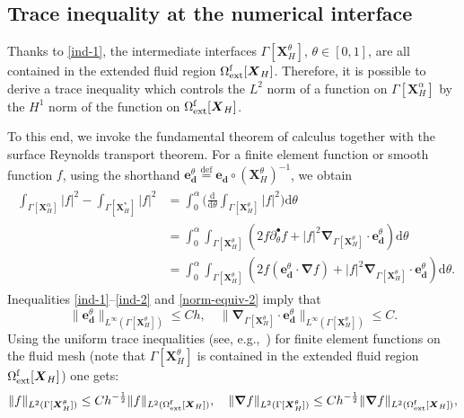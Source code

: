 \documentclass[11pt,reqno]{amsart}
\theoremstyle{definition}
\theoremstyle{plain}
\numberwithin{theorem}{section}
\numberwithin{proposition}{section}
\numberwithin{lemma}{section}
\numberwithin{equation}{section}
\newcommand{\bs}[1]{\boldsymbol{#1}}
\newcommand{\uu}[1]  {{\bs{#1}} }
\newcommand{\grad}   { \uu{\nabla}    }
\def\d{\mathrm{d}}
\renewcommand{\(}{\bigl(}
\renewcommand{\)}{\bigr)}
\def\eqd{\stackrel{\mathrm{def}}{=}}
\begin{document}
\subsection{Trace inequality at the numerical interface}
\label{section:trace}

Thanks to \eqref{ind-1}, the intermediate interfaces $\Gamma[{\bs X}_H^\theta]$, $\theta\in[0,1]$, are all contained in the extended fluid region $\Omega^{\rm f}_{\rm ext}[\bs X_H]$. Therefore, it is possible to derive a trace inequality which controls the $L^2$ norm of a function on $\Gamma[\bs X_H^\alpha]$ by the $H^1$ norm of the function on $\Omega^{\rm f}_{\rm ext}[\bs X_H]$. 

To this end, we invoke the fundamental theorem of calculus together with the surface Reynolds transport theorem. For a finite element function or smooth function $f$, using the shorthand ${\bs e}_{\bs d}^\theta\eqd{\bs e}_{\bs d}\circ({\bs X}_H^\theta)^{-1}$, we obtain
\begin{align}\label{L2-f-interface}
\begin{aligned}
\int_{\Gamma[\bs X_H^\alpha]} | f |^2 - \int_{\Gamma[\bs X_H^*]} | f |^2 
&= \int_0^{\alpha} \Big( \frac{\d}{\d\theta}\int_{\Gamma[\bs X_H^\theta]} | f |^2\Big) \d\theta \\
&= \int_0^{\alpha} \int_{\Gamma[\bs X_H^\theta]} ( 2f \partial_\theta^\bullet f + |f|^2\grad_{\Gamma[\bs X_H^\theta]}\cdot {\bs e}_{\bs d}^\theta) \d\theta \\
&= \int_0^{\alpha} \int_{\Gamma[\bs X_H^\theta]}( 2f ({\bs e}_{\bs d}^\theta\cdot \grad f) + |f|^2\grad_{\Gamma[\bs X_H^\theta]}\cdot {\bs e}_{\bs d}^\theta) \d\theta .
\end{aligned}
\end{align}
Inequalities \eqref{ind-1}--\eqref{ind-2} and \eqref{norm-equiv-2} imply that 
\begin{equation}\label{aux1006}
\|{\bs e}_{\bs d}^\theta\|_{L^{\infty}(\Gamma[\bs X_H^\theta])} \le C h ,\quad 
\|\grad_{\Gamma[\bs X_H^\theta]}\cdot {\bs e}_{\bs d}^\theta\|_{L^\infty(\Gamma[\bs X_H^\theta])}\le C .
\end{equation}
Using the uniform  trace inequalities (see, e.g.,~\cite{GuzmOlsh}) for finite element functions on the fluid mesh (note that $\Gamma[{\bs X}_H^\theta]$ is contained in the extended fluid region $\Omega^{\rm f}_{\rm ext}[{\bs X}_H]$) one gets:  
$$
\|f\|_{L^2(\Gamma[\bs X_H^\theta])} \le Ch^{-\frac12}\|f\|_{L^2(\Omega^{\rm f}_{\rm ext}[\bs X_H])},\quad 
\|\grad f\|_{L^2(\Gamma[\bs X_H^\theta])} \le Ch^{-\frac12}\|\grad f\|_{L^2(\Omega^{\rm f}_{\rm ext}[\bs X_H])} , 
$$ 
\end{document}
